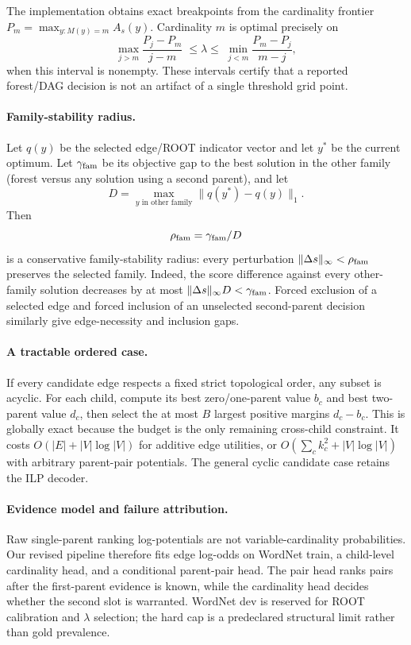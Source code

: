 The implementation obtains exact breakpoints from the cardinality frontier
$P_m=\max_{y:M(y)=m}A_s(y)$.  Cardinality $m$ is optimal precisely on
\begin{equation}
 \max_{j>m}\frac{P_j-P_m}{j-m}
 \;\leq\lambda\leq\;
 \min_{j<m}\frac{P_m-P_j}{m-j},
 \label{eq:penalty-interval}
\end{equation}
when this interval is nonempty.  These intervals certify that a reported
forest/DAG decision is not an artifact of a single threshold grid point.

\paragraph{Family-stability radius.}
Let $q(y)$ be the selected edge/ROOT indicator vector and let $y^*$ be the
current optimum.  Let $\gamma_{\rm fam}$ be its objective gap to the best
solution in the other family (forest versus any solution using a second
parent), and let
\begin{equation}
 D=\max_{y\text{ in other family}}\|q(y^*)-q(y)\|_1.
\end{equation}
Then
\begin{equation}
 \rho_{\rm fam}=\gamma_{\rm fam}/D
 \label{eq:family-radius}
\end{equation}
is a conservative family-stability radius: every perturbation
$\|\Delta s\|_\infty<\rho_{\rm fam}$ preserves the selected family.
Indeed, the score difference against every other-family solution decreases
by at most $\|\Delta s\|_\infty D<\gamma_{\rm fam}$.
Forced exclusion of a selected edge and forced inclusion of an unselected
second-parent decision similarly give edge-necessity and inclusion gaps.

\paragraph{A tractable ordered case.}
If every candidate edge respects a fixed strict topological order, any subset
is acyclic.  For each child, compute its best zero/one-parent value $b_c$ and
best two-parent value $d_c$, then select the at most $B$ largest positive
margins $d_c-b_c$.  This is globally exact because the budget is the only
remaining cross-child constraint.  It costs
$O(|E|+|V|\log|V|)$ for additive edge utilities, or
$O(\sum_c k_c^2+|V|\log|V|)$ with arbitrary parent-pair potentials.
The general cyclic candidate case retains the ILP decoder.

\paragraph{Evidence model and failure attribution.}
Raw single-parent ranking log-potentials are not variable-cardinality
probabilities.  Our revised pipeline therefore fits edge log-odds on WordNet
train, a child-level cardinality head, and a conditional parent-pair head.
The pair head ranks pairs after the first-parent evidence is known, while the
cardinality head decides whether the second slot is warranted.  WordNet dev
is reserved for ROOT calibration and $\lambda$ selection; the hard cap is a
predeclared structural limit rather than gold prevalence.

